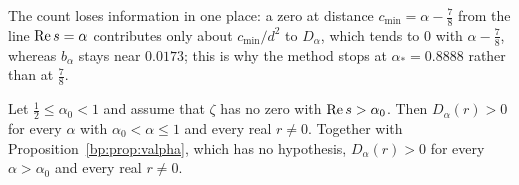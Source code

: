 The count loses information in one place: a zero at distance $c_{\min}=\alpha-\frac78$ from the line $\operatorname{Re} s=\alpha$ contributes only about $c_{\min}/d^2$ to $D_\alpha$, which tends to $0$ with $\alpha-\frac78$, whereas $b_\alpha$ stays near $0.0173$; this is why the method stops at $\alpha_*=0.8888$ rather than at $\frac78$.

\begin{theorem}\label{pol:thm:qrhpair}
Let $\frac12\le\alpha_0<1$ and assume that $\zeta$ has no zero with $\operatorname{Re} s>\alpha_0$. Then $D_\alpha(r)>0$ for every $\alpha$ with $\alpha_0<\alpha\le1$ and every real $r\ne0$. Together with Proposition~\ref{bp:prop:valpha}, which has no hypothesis, $D_\alpha(r)>0$ for every $\alpha>\alpha_0$ and every real $r\ne0$.
\end{theorem}

